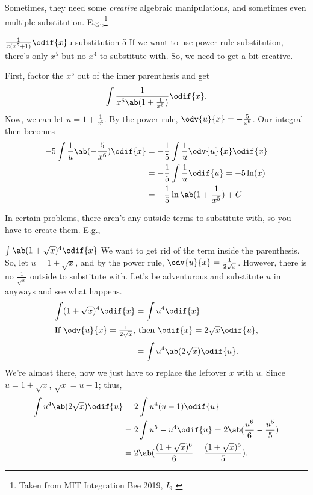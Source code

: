 Sometimes, they need some \emph{creative} algebraic manipulations, and sometimes even multiple substitution. E.g.,\footnote{Taken from MIT Integration Bee 2019, $I_9$ \cite{alkousa-2023}}
\begin{exmp}{$\frac{1}{x(x^5 + 1)}\odif{x}$}{u-substitution-5}
	If we want to use power rule substitution, there's only $x^5$ but no $x^4$ to substitute with. So, we need to get a bit creative.
	
	First, factor the $x^5$ out of the inner parenthesis and get
	\begin{equation}
		\int\frac{1}{x^6\ab(1 + \frac{1}{x^5})}\odif{x}.
	\end{equation}
	Now, we can let $u = 1 + \frac{1}{x^5}$. By the power rule, $\odv{u}{x} = -\frac{5}{x^6}$. Our integral then becomes
	\begin{align}
		-5\int\frac{1}{u}\ab(-\frac{5}{x^6})\odif{x} & = -\frac{1}{5}\int\frac{1}{u}\odv{u}{x}\odif{x}  \\
		                                             & = -\frac{1}{5}\int\frac{1}{u}\odif{u} = -5\ln(x) \\
		                                             & = -\frac{1}{5}\ln\ab(1 + \frac{1}{x^5}) + C
	\end{align}
\end{exmp}

In certain problems, there aren't any outside terms to substitute with, so you have to create them. E.g.,
\begin{exmp}{$\int\ab(1 + \sqrt{x})^4\odif{x}$}{}
	We want to get rid of the term inside the parenthesis. So, let $u = 1 + \sqrt{x}$, and by the power rule, $\odv{u}{x} = \frac{1}{2\sqrt{x}}$. However, there is no $\frac{1}{\sqrt{x}}$ outside to substitute with. Let's be adventurous and substitute $u$ in anyways and see what happens.
	\begin{align}
		\int(1 + \sqrt{x})^4\odif{x} & = \int u^4\odif{x}                 \\
		\intertext{If $\odv{u}{x} = \frac{1}{2\sqrt{x}}$, then $\odif{x} = 2\sqrt{x}\odif{u}$,}
		                             & = \int u^4\ab(2\sqrt{x})\odif{u}.
	\end{align}
	We're almost there, now we just have to replace the leftover $x$ with $u$. Since $u = 1 + \sqrt{x}$, $\sqrt{x} = u - 1$; thus,
	\begin{align}
		\int u^4\ab(2\sqrt{x})\odif{u} & = 2\int u^4(u - 1)\odif{u}                                        \\
		                               & = 2\int u^5 - u^4\odif{u} = 2\ab(\frac{u^6}{6} - \frac{u^5}{5})   \\
		                               & = 2\ab(\frac{(1 + \sqrt{x})^6}{6} - \frac{(1 + \sqrt{x})^5}{5}).
	\end{align}
\end{exmp}

